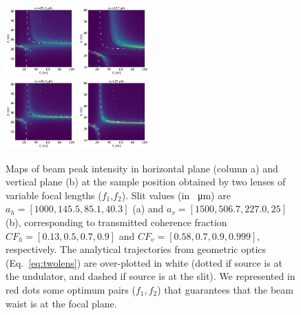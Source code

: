 \documentclass[doublecol]{epl2}
\begin{document}
\begin{figure}[htbp]
\includegraphics[width=0.24\textwidth]{H_1.png}
\includegraphics[width=0.24\textwidth]{V_1.png}\\
\includegraphics[width=0.24\textwidth]{H_0.png}
\includegraphics[width=0.24\textwidth]{V_0.png}
\caption{
        \label{fig:f1f2map}
    Maps of beam peak intensity in horizontal plane (column a) and vertical plane (b) at the sample position obtained by two lenses of variable focal lengths ($f_1$,$f_2$).
    Slit values (in \SI{}{\micro\meter}) are $a_h=[1000, 145.5, 85.1, 40.3]$ (a) and $a_v=[1500, 506.7, 227.0, 25]$ (b), corresponding to transmitted coherence fraction
    $CF_h=[0.13, 0.5, 0.7, 0.9]$ and
    $CF_v=[0.58, 0.7, 0.9, 0.999]$, respectively.
    The analytical trajectories from geometric optics (Eq.~\ref{eq:twolens}) are over-plotted in white (dotted if source is at the undulator, and dashed if source is at the slit). We represented in red dots some optimum pairs ($f_1,f_2$) that guarantees that the beam waist is at the focal plane.
    }
\end{figure}



\end{document}
